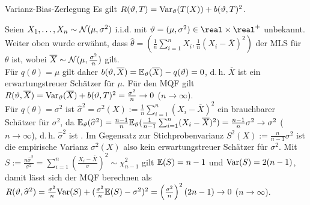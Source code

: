 \begin{Lemma}{Varianz-Bias-Zerlegung}
    Es gilt $R(\vartheta, T) = \mathrm{Var}_\vartheta(T(X)) + b(\vartheta, T)^2$.
\end{Lemma}

\linie

\begin{Bsp}
    Seien $X_1, \dotsc, X_n \sim \mathcal{N}(\mu, \sigma^2)$ i.i.d. mit
    $\theta = (\mu, \sigma^2) \in \real \times \real^+$ unbekannt.
    Weiter oben wurde erwähnt, dass
    $\widehat{\theta} = (\frac{1}{n} \sum_{i=1}^n X_i, \frac{1}{n} (X_i - \overline{X})^2)$
    der MLS für $\theta$ ist, wobei $\overline{X} \sim \mathcal{N}(\mu, \frac{\sigma^2}{n})$ gilt.\\
    Für $q(\theta) = \mu$ gilt daher
    $b(\vartheta, \overline{X}) = \mathbb{E}_\vartheta(\overline{X}) - q(\vartheta) = 0$,
    d.\,h. $\overline{X}$ ist ein erwartungstreuer Schätzer für $\mu$.
    Für den MQF gilt $R(\vartheta, \overline{X}) = \mathrm{Var}_\vartheta(\overline{X}) + b(\vartheta, T)^2
    = \frac{\sigma^2}{n} \to 0$ ($n \to \infty$).\\
    Für $q(\theta) = \sigma^2$ ist $\widehat{\sigma}^2 = \sigma^2(X) :=
    \frac{1}{n} \sum_{i=1}^n (X_i - \overline{X})^2$ ein brauchbarer Schätzer für $\sigma^2$,
    da $\mathbb{E}_\vartheta(\widehat{\sigma}^2) = \frac{n-1}{n} \mathbb{E}_\vartheta(\frac{1}{n-1}
    \sum_{i=1}^n (X_i - \overline{X})^2) = \frac{n-1}{n} \sigma^2 \to \sigma^2$ ($n \to \infty$),
    d.\,h. $\widehat{\sigma}^2$ ist .
    Im Gegensatz zur Stichprobenvarianz $S^2(X) := \frac{n}{n-1} \sigma^2$ ist
    die empirische Varianz $\sigma^2(X)$ also kein erwartungstreuer Schätzer für $\sigma^2$.
    Mit $S := \frac{n\widehat{\sigma}^2}{\sigma^2} =
    \sum_{i=1}^n \left(\frac{X_i - \overline{X}}{\sigma}\right)^2 \sim \chi_{n-1}^2$ gilt
    $\mathbb{E}(S) = n - 1$ und $\mathrm{Var}(S) = 2(n - 1)$, damit lässt sich der MQF berechnen als\\
    $R(\vartheta, \widehat{\sigma}^2) = \frac{\sigma^2}{n} \mathrm{Var}(S) +
    (\frac{\sigma^2}{n} \mathbb{E}(S) - \sigma^2)^2 =
    \left(\frac{\sigma^2}{n}\right)^2 (2n-1) \to 0$ ($n \to \infty$).
\end{Bsp}

